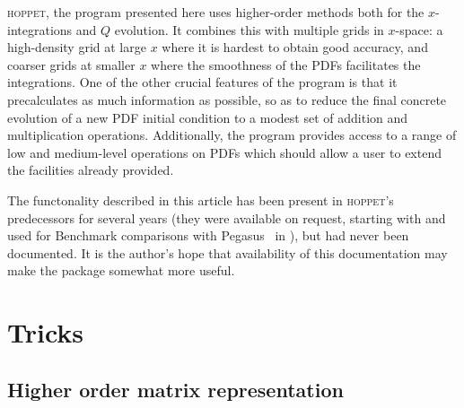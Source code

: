 \documentclass[12pt]{article}
\newcommand{\hoppet}{\textsc{hoppet}\xspace}
\begin{document}
\hoppet, the program presented here uses higher-order methods both for
the $x$-integrations and $Q$ evolution. It combines this with multiple
grids in $x$-space: a high-density grid at large $x$ where it is
hardest to obtain good accuracy, and coarser grids at smaller $x$
where the smoothness of the PDFs facilitates the integrations. One of
the other crucial features of the program is that it precalculates as
much information as possible, so as to reduce the final concrete
evolution of a new PDF initial condition to a modest set of addition
and multiplication operations. Additionally, the program provides
access to a range of low and medium-level operations on PDFs which
should allow a user to extend the facilities already provided.


The functonality described in this article has been present in
\hoppet's predecessors for several years (they were available on
request, starting with \cite{DisResum} and used for Benchmark
comparisons with Pegasus~\cite{Pegasus} in \cite{Benchmarks}), but had
never been documented.  It is the author's hope that availability of
this documentation may make the package somewhat more useful.


\section{Tricks}
\label{tricks}

\subsection{Higher order matrix representation}
\label{sec:highord}
\end{document}

